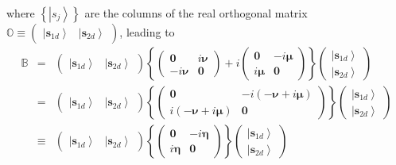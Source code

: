\documentclass[aps,preprint]{revtex4}
\begin{document}
where $\left\{ \left\vert s_{j}\right\rangle \right\} $ are the columns of
the real orthogonal matrix $\mathbb{O\equiv }\left( 
\begin{array}{cc}
\left\vert \mathbf{s}_{1d}\right\rangle & \left\vert \mathbf{s}%
_{2d}\right\rangle%
\end{array}%
\right) $, leading to 
\begin{eqnarray}
\mathbb{B} &=&\left( 
\begin{array}{cc}
\left\vert \mathbf{s}_{1d}\right\rangle & \left\vert \mathbf{s}%
_{2d}\right\rangle%
\end{array}%
\right) \left\{ \left( 
\begin{array}{cc}
\mathbf{0} & i\mathbf{\nu } \\ 
-i\mathbf{\nu } & \mathbf{0}%
\end{array}%
\right) +i\left( 
\begin{array}{cc}
\mathbf{0} & -i\mathbf{\mu } \\ 
i\mathbf{\mu } & \mathbf{0}%
\end{array}%
\right) \right\} \left( 
\begin{array}{c}
\left\vert \mathbf{s}_{1d}\right\rangle \\ 
\left\vert \mathbf{s}_{2d}\right\rangle%
\end{array}%
\right) \\
&\mathbb{=}&\left( 
\begin{array}{cc}
\left\vert \mathbf{s}_{1d}\right\rangle & \left\vert \mathbf{s}%
_{2d}\right\rangle%
\end{array}%
\right) \left\{ \left( 
\begin{array}{cc}
\mathbf{0} & -i\left( -\mathbf{\nu +}i\mathbf{\mu }\right) \\ 
i\left( -\mathbf{\nu +}i\mathbf{\mu }\right) & \mathbf{0}%
\end{array}%
\right) \right\} \left( 
\begin{array}{c}
\left\vert \mathbf{s}_{1d}\right\rangle \\ 
\left\vert \mathbf{s}_{2d}\right\rangle%
\end{array}%
\right) \\
&\equiv &\left( 
\begin{array}{cc}
\left\vert \mathbf{s}_{1d}\right\rangle & \left\vert \mathbf{s}%
_{2d}\right\rangle%
\end{array}%
\right) \left\{ \left( 
\begin{array}{cc}
\mathbf{0} & -i\mathbf{\eta } \\ 
i\mathbf{\eta } & \mathbf{0}%
\end{array}%
\right) \right\} \left( 
\begin{array}{c}
\left\vert \mathbf{s}_{1d}\right\rangle \\ 
\left\vert \mathbf{s}_{2d}\right\rangle%
\end{array}%
\right)
\end{eqnarray}%
\end{document}
